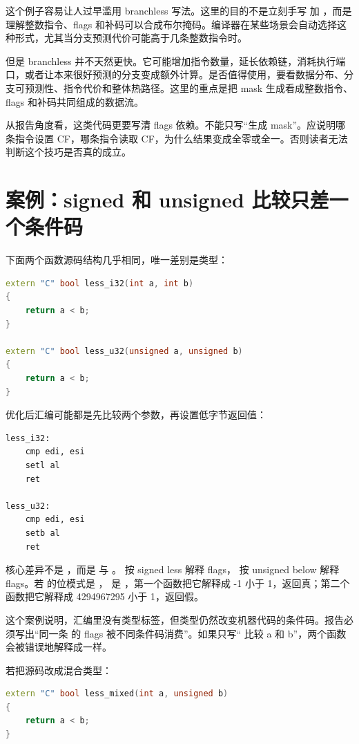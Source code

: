 这个例子容易让人过早滥用 branchless 写法。这里的目的不是立刻手写  加 ，而是理解整数指令、flags 和补码可以合成布尔掩码。编译器在某些场景会自动选择这种形式，尤其当分支预测代价可能高于几条整数指令时。

但是 branchless 并不天然更快。它可能增加指令数量，延长依赖链，消耗执行端口，或者让本来很好预测的分支变成额外计算。是否值得使用，要看数据分布、分支可预测性、指令代价和整体热路径。这里的重点是把 mask 生成看成整数指令、flags 和补码共同组成的数据流。

从报告角度看，这类代码更要写清 flags 依赖。不能只写“生成 mask”。应说明哪条指令设置 CF，哪条指令读取 CF，为什么结果变成全零或全一。否则读者无法判断这个技巧是否真的成立。

\section{案例：signed 和 unsigned 比较只差一个条件码}

下面两个函数源码结构几乎相同，唯一差别是类型：

\begin{lstlisting}[language=C++]
extern "C" bool less_i32(int a, int b)
{
    return a < b;
}

extern "C" bool less_u32(unsigned a, unsigned b)
{
    return a < b;
}
\end{lstlisting}

优化后汇编可能都是先比较两个参数，再设置低字节返回值：

\begin{lstlisting}
less_i32:
    cmp edi, esi
    setl al
    ret

less_u32:
    cmp edi, esi
    setb al
    ret
\end{lstlisting}

核心差异不是 ，而是  与 。 按 signed less 解释 flags， 按 unsigned below 解释 flags。若  的位模式是 ， 是 ，第一个函数把它解释成 -1 小于 1，返回真；第二个函数把它解释成 4294967295 小于 1，返回假。

这个案例说明，汇编里没有类型标签，但类型仍然改变机器代码的条件码。报告必须写出“同一条  的 flags 被不同条件码消费”。如果只写“ 比较 a 和 b”，两个函数会被错误地解释成一样。

若把源码改成混合类型：

\begin{lstlisting}[language=C++]
extern "C" bool less_mixed(int a, unsigned b)
{
    return a < b;
}
\end{lstlisting}

